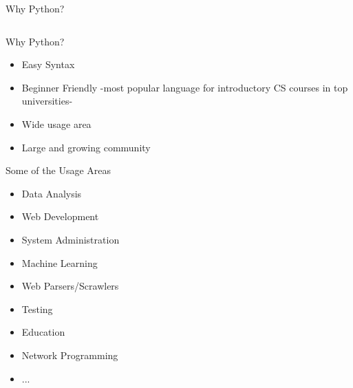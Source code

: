 	\begin{frame}{Why Python?}
		\vspace{-3mm}
		\inputminted[frame=single,framesep=2pt]{python3}{code-examples/io.py}
	\end{frame}

	\begin{frame}{Why Python?}
		\begin{itemize}
			\LARGE
			\item Easy Syntax
			\item Beginner Friendly
			-most popular language for introductory CS courses in top universities\cite{guo1}- 
			\item Wide usage area
			\item Large and growing community
		\end{itemize}
	\end{frame}

	\begin{frame}{Some of the Usage Areas \cite{survey_jetbrains2018}}
		\begin{itemize}
			\LARGE
			\item Data Analysis
			\item Web Development
			\item System Administration
			\item Machine Learning
			\item Web Parsers/Scrawlers
			\item Testing
			\item Education
			\item Network Programming
			\item ...
		\end{itemize}	
	\end{frame}
	
